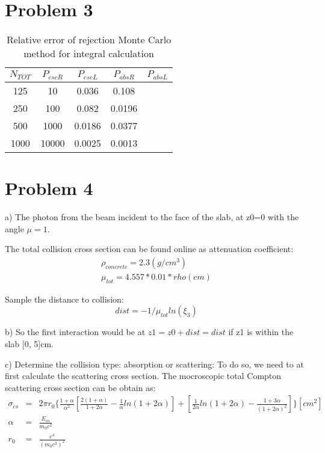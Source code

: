 \documentclass[paper=a4, fontsize=11pt]{article} %
\newcommand{\ra}[1]{\renewcommand{\arraystretch}{#1}}
\begin{document}
\section*{Problem 3}

\begin{table*}[h]\centering
\ra{1.3}
\begin{tabular}{@{}ccccc@{}}\toprule
 $N_{TOT}$ & $P_{escR}$ & $P_{escL}$ & $P_{absR}$ &$P_{absL}$ \\ \midrule
  125      & 10         & 0.036     &0.108 \\
  250      & 100        & 0.082    &0.0196 \\
  500      & 1000       & 0.0186 & 0.0377 \\
  1000     & 10000      & 0.0025 & 0.0013 \\
\bottomrule
\end{tabular}
\caption{Relative error of rejection Monte Carlo method for integral calculation}
\label{pb1}
\end{table*}

\section*{Problem 4}


a) The photon from the beam incident to the face of the slab, at z0=0 with the angle $\mu = 1$. 

The total collision cross section can be found online as attenuation coefficient:
\begin{eqnarray}
\rho_{concrete} = 2.3 (g/cm^3) \nonumber\\
\mu_{tot} = 4.557 * 0.01 * rho (cm)
\end{eqnarray}

Sample the distance to collision:
\begin{equation}
dist = -1/\mu_{tot} ln(\xi_3)
\end{equation}

b) So the first interaction would be at $z1 = z0 + dist = dist$ if z1 is within the slab [0, 5]cm.

c) Determine the collision type: absorption or scattering:
To do so, we need to at first calculate the scattering cross section. The mocroscopic total Compton scattering cross section can be obtain as:
\begin{eqnarray}
\sigma _{cs} &=& 2 \pi r_0 \{ \frac{1+\alpha} {\alpha ^2} [\frac{2(1+\alpha)}{1+2\alpha} - \frac{1}{\alpha} ln(1+2\alpha)] + [\frac{1}{2\alpha} ln(1+2\alpha) - \frac{1+3\alpha}{(1+2\alpha)^2}] \} [cm^2] \nonumber\\
\alpha &=& \frac{E_{in}}{m_0 c^2} \nonumber\\
r_0 &=& \frac{e^4}{(m_0 c^2)^2}
\end{eqnarray}
\end{document}
